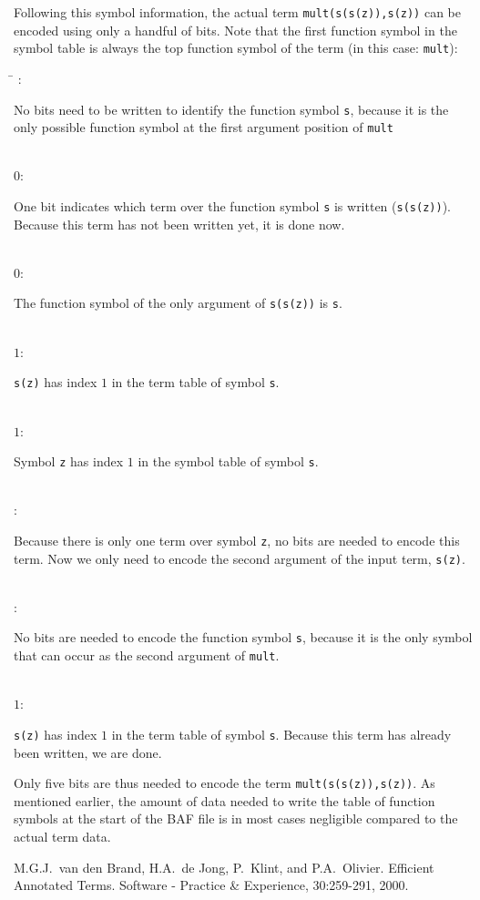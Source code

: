 \documentclass{article}
\newcommand{\tabline}[2]
{#1\>: 
\begin{minipage}[t]{\textwidth-1.5cm}
#2
\end{minipage}}
\begin{document}
Following this symbol information, the actual term \texttt{mult(s(s(z)),s(z))} can be encoded using only
a handful of bits. Note that the first function symbol in the symbol table is always the top function symbol
of the term (in this case: \texttt{mult}):

\begin{tabbing}
\hspace{1.5cm}\=\kill
\tabline{   }{No bits need to be written to identify the function symbol \texttt{s}, because it is the only 
              possible function symbol at the first argument position of \texttt{mult}}\\
\tabline{$0$}{One bit indicates which term over the function symbol \texttt{s} is written (\texttt{s(s(z))}). 
              Because this term has not been written yet, it is done now.}\\
\tabline{$0$}{The function symbol of the only argument of \texttt{s(s(z))} is \texttt{s}.}\\
\tabline{$1$}{\texttt{s(z)} has index $1$ in the term table of symbol \texttt{s}.}\\
\tabline{$1$}{Symbol \texttt{z} has index $1$ in the symbol table of symbol \texttt{s}.}\\
\tabline{   }{Because there is only one term over symbol \texttt{z}, no bits are needed to 
              encode this term. Now we only need to encode the second argument of the input term, \texttt{s(z)}.}\\
\tabline{    }{No bits are needed to encode the function symbol \texttt{s}, because it is the only symbol that 
               can occur as the second argument of \texttt{mult}.}\\
\tabline{$1$}{\texttt{s(z)} has index $1$ in the term table of symbol \texttt{s}. Because this term has already been 
              written, we are done.}
\end{tabbing}

Only five bits are thus needed to encode the term \texttt{mult(s(s(z)),s(z))}. As mentioned earlier, the amount of data
needed to write the table of function symbols at the start of the BAF file is in most cases negligible compared to the
actual term data.

\begin{thebibliography}{1}
M.G.J.\ van den Brand, H.A.\ de Jong, P.\ Klint, and P.A.\ Olivier.
Efficient Annotated Terms. Software - Practice \& Experience, 30:259-291, 2000.
\end{thebibliography}
\end{document}
